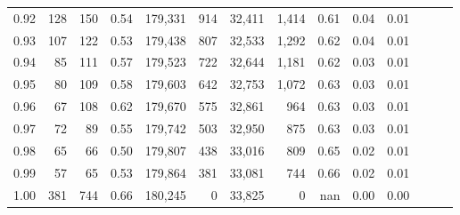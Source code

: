 \begin{tabular}{rrrrrrrrrrrrrr}
0.92 &    128 &  150 &  0.54 &  179,331 &      914 &  32,411 &   1,414 &  0.61 &  0.04 &      0.01 \\
0.93 &    107 &  122 &  0.53 &  179,438 &      807 &  32,533 &   1,292 &  0.62 &  0.04 &      0.01 \\
0.94 &     85 &  111 &  0.57 &  179,523 &      722 &  32,644 &   1,181 &  0.62 &  0.03 &      0.01 \\
0.95 &     80 &  109 &  0.58 &  179,603 &      642 &  32,753 &   1,072 &  0.63 &  0.03 &      0.01 \\
0.96 &     67 &  108 &  0.62 &  179,670 &      575 &  32,861 &     964 &  0.63 &  0.03 &      0.01 \\
0.97 &     72 &   89 &  0.55 &  179,742 &      503 &  32,950 &     875 &  0.63 &  0.03 &      0.01 \\
0.98 &     65 &   66 &  0.50 &  179,807 &      438 &  33,016 &     809 &  0.65 &  0.02 &      0.01 \\
0.99 &     57 &   65 &  0.53 &  179,864 &      381 &  33,081 &     744 &  0.66 &  0.02 &      0.01 \\
1.00 &    381 &  744 &  0.66 &  180,245 &        0 &  33,825 &       0 &   nan &  0.00 &      0.00 \\
\bottomrule
\end{tabular}
